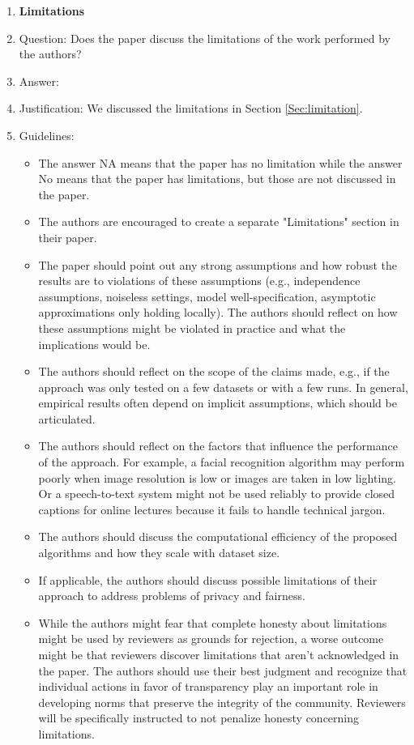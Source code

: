 \documentclass{article}
\begin{document}
\begin{enumerate}
\item {\bf Limitations}
    \item[] Question: Does the paper discuss the limitations of the work performed by the authors?
    \item[] Answer: \answerYes{} %
    \item[] Justification: We discussed the limitations in Section \ref{Sec:limitation}.
    \item[] Guidelines:
    \begin{itemize}
        \item The answer NA means that the paper has no limitation while the answer No means that the paper has limitations, but those are not discussed in the paper. 
        \item The authors are encouraged to create a separate "Limitations" section in their paper.
        \item The paper should point out any strong assumptions and how robust the results are to violations of these assumptions (e.g., independence assumptions, noiseless settings, model well-specification, asymptotic approximations only holding locally). The authors should reflect on how these assumptions might be violated in practice and what the implications would be.
        \item The authors should reflect on the scope of the claims made, e.g., if the approach was only tested on a few datasets or with a few runs. In general, empirical results often depend on implicit assumptions, which should be articulated.
        \item The authors should reflect on the factors that influence the performance of the approach. For example, a facial recognition algorithm may perform poorly when image resolution is low or images are taken in low lighting. Or a speech-to-text system might not be used reliably to provide closed captions for online lectures because it fails to handle technical jargon.
        \item The authors should discuss the computational efficiency of the proposed algorithms and how they scale with dataset size.
        \item If applicable, the authors should discuss possible limitations of their approach to address problems of privacy and fairness.
        \item While the authors might fear that complete honesty about limitations might be used by reviewers as grounds for rejection, a worse outcome might be that reviewers discover limitations that aren't acknowledged in the paper. The authors should use their best judgment and recognize that individual actions in favor of transparency play an important role in developing norms that preserve the integrity of the community. Reviewers will be specifically instructed to not penalize honesty concerning limitations.
    \end{itemize}


\end{enumerate}
\end{document}
